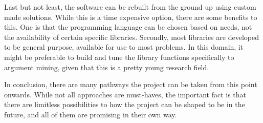     Last but not least, the software can be rebuilt from the ground up using custom made solutions. While this is a time expensive option, there are some benefits to this. One is that the programming language can be chosen based on needs, not the availability of certain specific libraries. Secondly, most libraries are developed to be general purpose, available for use to most problems. In this domain, it might be preferable to build and tune the library functions specifically to argument mining, given that this is a pretty young research field.
    
    In conclusion, there are many pathways the project can be taken from this point onwards. While not all approaches are must-haves, the important fact is that there are limitless possibilities to how the project can be shaped to be in the future, and all of them are promising in their own way.
    
    